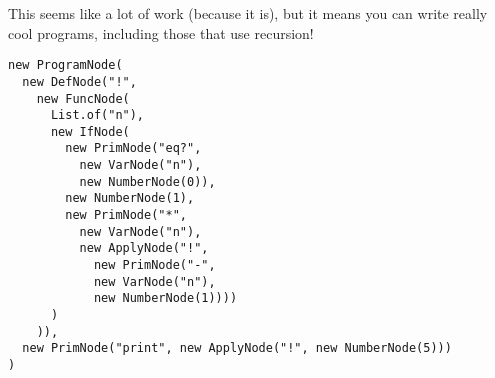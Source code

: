 \begin{enumerate}[label=(\alph*)]
\begin{enumerate}[label=(\roman*)]
  \end{enumerate}
  This seems like a lot of work (because it is), but it means you can write really cool programs, including those that use recursion!
  \begin{verbatim}
new ProgramNode(
  new DefNode("!", 
    new FuncNode(
      List.of("n"),
      new IfNode(
        new PrimNode("eq?", 
          new VarNode("n"), 
          new NumberNode(0)),
        new NumberNode(1),
        new PrimNode("*", 
          new VarNode("n"), 
          new ApplyNode("!", 
            new PrimNode("-", 
            new VarNode("n"), 
            new NumberNode(1))))
      )
    )),
  new PrimNode("print", new ApplyNode("!", new NumberNode(5)))
)
\end{verbatim}
\end{enumerate}